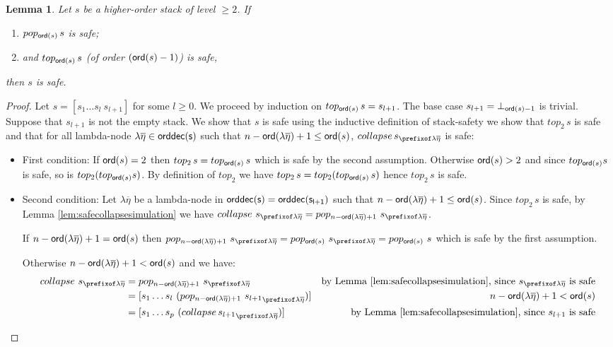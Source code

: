 \documentclass[a4paper]{article}
\newtheorem{lemma}{Lemma}[section]
\theoremstyle{remark}
\theoremstyle{definition}
\newcommand\orddec{\sf orddec}
\begin{document}
\begin{lemma}
\label{lem:cons_qsafety} Let $s$ be a higher-order stack of level $\geq 2$. If
\begin{enumerate}[1.]
\item $pop_{{\sf ord}(s)}\,s$ is safe;
\item and $top_{{\sf ord}(s)}\,s$ (of order $({\sf ord}(s)-1)$) is safe,
\end{enumerate}
then $s$ is safe.
\end{lemma}
\begin{proof}
Let $s = [s_1 \ldots s_l~s_{l+1}]$ for some $l\geq0$.
We proceed by induction on  $top_{{\sf ord}(s)}\,s=s_{l+1}$.
The base case $s_{l+1} = \bot_{{\sf ord}(s)-1}$ is trivial.
Suppose that $s_{l+1}$ is not the empty stack. We show that $s$ is safe using the inductive definition of stack-safety \ie we show that $top_2\,s$ is safe and that for all lambda-node $\lambda \overline{\eta} \in \orddec(s)$ such that $n-{\sf ord}(\lambda \overline{\eta})+1 \leq {\sf ord}(s)$, $collapse\,s_{\prefixof \lambda \overline{\eta}}$ is safe:
\begin{itemize}
\item First condition: If ${\sf ord}(s)=2$ then $top_2\,s = top_{{\sf ord}(s)}\,s$ which is safe by the second assumption. Otherwise ${\sf ord}(s)>2$ and since $top_{{\sf ord}(s)} s$ is safe, so is $top_2(top_{{\sf ord}(s)} s)$. By definition of $top_2$ we have $top_2\,s = top_2(top_{{\sf ord}(s)}\, s)$ hence $top_2\,s$ is safe.

\item Second condition: Let $\lambda \overline{\eta}$ be a lambda-node in $\orddec(s) = \orddec(s_{l+1})$ such that $n-{\sf ord}(\lambda \overline{\eta})+1 \leq {\sf ord}(s)$.
Since $top_2\,s$ is safe, by Lemma \ref{lem:safecollapsesimulation} we have
$collapse~s_{\prefixof \lambda \overline{\eta}} = pop_{n-\ord{\lambda \overline{\eta}}+1}~s_{\prefixof \lambda \overline{\eta}}$.

If $n-{\sf ord}(\lambda \overline{\eta})+1 = {\sf ord}(s)$ then
$pop_{n-\ord{\lambda \overline{\eta}}+1}~s_{\prefixof \lambda \overline{\eta}} = pop_{\ord{s}}~s_{\prefixof\lambda\overline\eta} = pop_{\ord{s}}~s$ which is safe by the first assumption.

Otherwise $n-{\sf ord}(\lambda \overline{\eta})+1 < {\sf ord}(s)$ and we have:
\begin{align*}
  collapse~s_{\prefixof\lambda\overline\eta}
      &= pop_{n-\ord{\lambda \overline{\eta}}+1}~s_{\prefixof\lambda\overline\eta}
      & \mbox{by Lemma \ref{lem:safecollapsesimulation}, since $s_{\prefixof\lambda\overline\eta}$ is safe} \\
  &= [ s_1 \ldots s_l\ (pop_{n-\ord{\lambda\overline\eta}+1}~ {s_{l+1}}_{\prefixof\lambda\overline\eta}) ]
   & \mbox{$n-\ord{\lambda \overline{\eta}}+1<\ord{s}$}  \\
  &= [s_1 \ldots s_p\ (collapse\, {s_{l+1}}_{\prefixof\lambda\overline\eta}) ]
  & \mbox{by Lemma \ref{lem:safecollapsesimulation}, since $s_{l+1}$ is safe}
\end{align*}


\end{itemize}
\end{proof}
\end{document}

